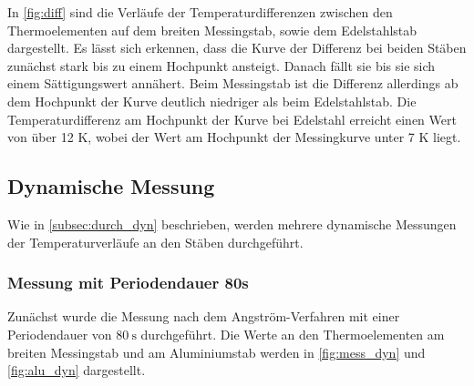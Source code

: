 In \autoref{fig:diff} sind die Verläufe der Temperaturdifferenzen zwischen den Thermoelementen auf dem breiten Messingstab, sowie dem Edelstahlstab dargestellt.
Es lässt sich erkennen, dass die Kurve der Differenz bei beiden Stäben zunächst stark bis zu einem Hochpunkt ansteigt. Danach fällt sie bis sie sich einem Sättigungswert annähert.
Beim Messingstab ist die Differenz allerdings ab dem Hochpunkt der Kurve deutlich niedriger als beim Edelstahlstab.
Die Temperaturdifferenz am Hochpunkt der Kurve bei Edelstahl erreicht einen Wert von über 12 K, wobei der Wert am Hochpunkt der Messingkurve unter 7 K liegt.

\subsection{Dynamische Messung}
\label{subsec:aus_dyn}
Wie in \autoref{subsec:durch_dyn} beschrieben, werden mehrere dynamische Messungen der Temperaturverläufe an den Stäben durchgeführt. 


\subsubsection{Messung mit Periodendauer 80s}
\label{subsec:aus_dyn80}

Zunächst wurde die Messung nach dem Angström-Verfahren mit einer Periodendauer von $\qty{80}{\second}$ durchgeführt.
Die Werte an den Thermoelementen am breiten Messingstab und am Aluminiumstab werden in \autoref{fig:mess_dyn} und \autoref{fig:alu_dyn} dargestellt.


